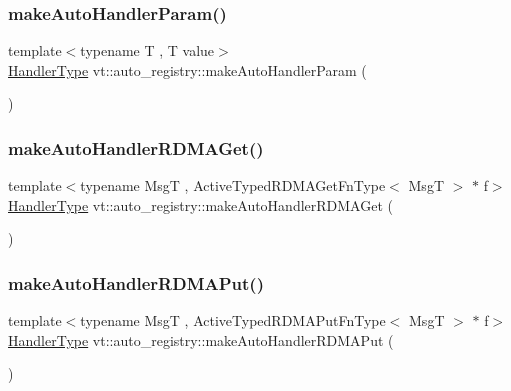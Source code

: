 \subsubsection{\texorpdfstring{make\+Auto\+Handler\+Param()}{makeAutoHandlerParam()}}
{\footnotesize\ttfamily template$<$typename T , T value$>$ \\
\hyperlink{namespacevt_af64846b57dfcaf104da3ef6967917573}{Handler\+Type} vt\+::auto\+\_\+registry\+::make\+Auto\+Handler\+Param (\begin{DoxyParamCaption}{ }\end{DoxyParamCaption})\hspace{0.3cm}{\ttfamily [inline]}}

\mbox{\label{namespacevt_1_1auto__registry_a4ae7737d1cfa28838af83f35778dc46f}} 
\subsubsection{\texorpdfstring{make\+Auto\+Handler\+R\+D\+M\+A\+Get()}{makeAutoHandlerRDMAGet()}}
{\footnotesize\ttfamily template$<$typename MsgT , Active\+Typed\+R\+D\+M\+A\+Get\+Fn\+Type$<$ Msg\+T $>$ $\ast$ f$>$ \\
\hyperlink{namespacevt_af64846b57dfcaf104da3ef6967917573}{Handler\+Type} vt\+::auto\+\_\+registry\+::make\+Auto\+Handler\+R\+D\+M\+A\+Get (\begin{DoxyParamCaption}{ }\end{DoxyParamCaption})\hspace{0.3cm}{\ttfamily [inline]}}

\mbox{\label{namespacevt_1_1auto__registry_ab932bdb453695e6be54e2647dabd8c2a}} 
\subsubsection{\texorpdfstring{make\+Auto\+Handler\+R\+D\+M\+A\+Put()}{makeAutoHandlerRDMAPut()}}
{\footnotesize\ttfamily template$<$typename MsgT , Active\+Typed\+R\+D\+M\+A\+Put\+Fn\+Type$<$ Msg\+T $>$ $\ast$ f$>$ \\
\hyperlink{namespacevt_af64846b57dfcaf104da3ef6967917573}{Handler\+Type} vt\+::auto\+\_\+registry\+::make\+Auto\+Handler\+R\+D\+M\+A\+Put (\begin{DoxyParamCaption}{ }\end{DoxyParamCaption})\hspace{0.3cm}{\ttfamily [inline]}}

